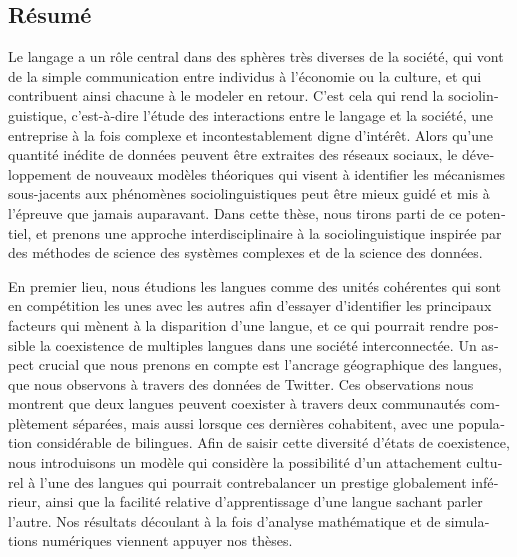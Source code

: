 \documentclass[../thesis.tex]{subfiles}
\begin{document}
\begin{otherlanguage}{french}
\chapter*{Résumé}
Le langage a un rôle central dans des sphères très diverses de la société, qui vont de la simple communication entre individus à l'économie ou la culture, et qui contribuent ainsi chacune à le modeler en retour.
C'est cela qui rend la sociolinguistique, c'est-à-dire l'étude des
interactions entre le langage et la société, une entreprise à la fois complexe et
incontestablement digne d'intérêt. Alors qu'une quantité inédite de données peuvent être
extraites des réseaux sociaux, le développement de nouveaux modèles théoriques qui
visent à identifier les mécanismes sous-jacents aux phénomènes sociolinguistiques peut
être mieux guidé et mis à l'épreuve que jamais auparavant. Dans cette thèse, nous tirons
parti de ce potentiel, et prenons une approche interdisciplinaire à la sociolinguistique
inspirée par des méthodes de science des systèmes complexes et de la science des
données.

En premier lieu, nous étudions les langues comme des unités cohérentes qui sont en
compétition les unes avec les autres afin d'essayer d'identifier les principaux facteurs
qui mènent à la disparition d'une langue, et ce qui pourrait rendre possible la coexistence de
multiples langues dans une société interconnectée. Un aspect crucial que nous prenons en
compte est l'ancrage géographique des langues, que nous observons à travers des données
de Twitter. Ces observations nous montrent que deux langues peuvent coexister à travers
deux communautés complètement séparées, mais aussi lorsque ces dernières cohabitent,
avec une population considérable de bilingues. Afin de saisir cette diversité d'états de
coexistence, nous introduisons un modèle qui considère la possibilité d'un attachement
culturel à l'une des langues qui pourrait contrebalancer un prestige globalement
inférieur, ainsi que la facilité relative d'apprentissage d'une langue sachant parler
l'autre. Nos résultats découlant à la fois d'analyse mathématique et de simulations
numériques viennent appuyer nos thèses.


\end{otherlanguage}
\end{document}
